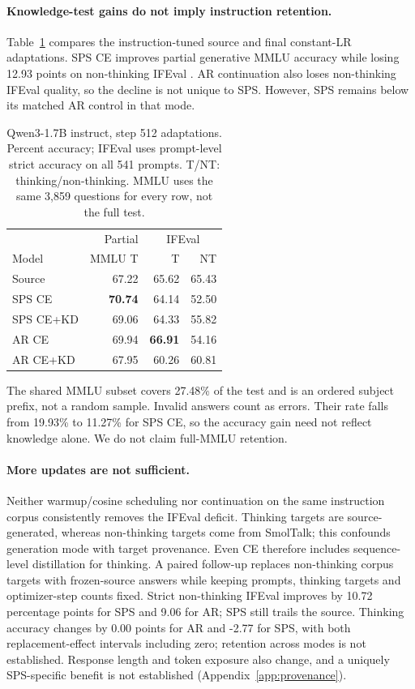\documentclass[11pt]{article}
\begin{document}
\paragraph{Knowledge-test gains do not imply instruction retention.}
Table~\ref{tab:main} compares the instruction-tuned source and final constant-LR adaptations. SPS CE improves partial generative MMLU accuracy while losing 12.93 points on non-thinking IFEval \citep{zhou2023ifeval}. AR continuation also loses non-thinking IFEval quality, so the decline is not unique to SPS. However, SPS remains below its matched AR control in that mode.

\begin{table}[t]
\centering\small
\begin{tabular}{lrrr}
\toprule
& Partial & \multicolumn{2}{c}{IFEval}\\
Model & MMLU T & T & NT\\
\midrule
Source & 67.22 & 65.62 & 65.43\\
SPS CE & \textbf{70.74} & 64.14 & 52.50\\
SPS CE+KD & 69.06 & 64.33 & 55.82\\
AR CE & 69.94 & \textbf{66.91} & 54.16\\
AR CE+KD & 67.95 & 60.26 & 60.81\\
\bottomrule
\end{tabular}
\caption{Qwen3-1.7B instruct, step 512 adaptations. Percent accuracy; IFEval uses prompt-level strict accuracy on all 541 prompts. T/NT: thinking/non-thinking. MMLU uses the same 3,859 questions for every row, not the full test.}
\label{tab:main}
\end{table}

The shared MMLU subset \citep{hendrycks2021mmlu} covers 27.48\% of the test and is an ordered subject prefix, not a random sample. Invalid answers count as errors. Their rate falls from 19.93\% to 11.27\% for SPS CE, so the accuracy gain need not reflect knowledge alone. We do not claim full-MMLU retention.

\paragraph{More updates are not sufficient.}
Neither warmup/cosine scheduling nor continuation on the same instruction corpus consistently removes the IFEval deficit. Thinking targets are source-generated, whereas non-thinking targets come from SmolTalk; this confounds generation mode with target provenance. Even CE therefore includes sequence-level distillation for thinking. A paired follow-up replaces non-thinking corpus targets with frozen-source answers while keeping prompts, thinking targets and optimizer-step counts fixed. Strict non-thinking IFEval improves by 10.72 percentage points for SPS and 9.06 for AR; SPS still trails the source. Thinking accuracy changes by 0.00 points for AR and -2.77 for SPS, with both replacement-effect intervals including zero; retention across modes is not established. Response length and token exposure also change, and a uniquely SPS-specific benefit is not established (Appendix~\ref{app:provenance}).
\end{document}
